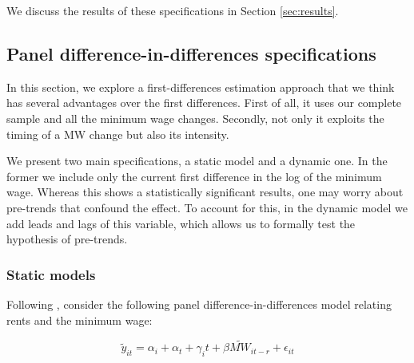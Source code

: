     We discuss the results of these specifications in Section \ref{sec:results}.
    

\subsection{Panel difference-in-differences specifications} \label{subsec:empirical_strategy/first-difference}

    In this section, we explore a first-differences estimation approach that we think has several advantages over the first differences. First of all, it uses our complete sample and all the minimum wage changes. Secondly, not only it exploits the timing of a MW change but also its intensity. 
    
    We present two main specifications, a static model and a dynamic one. In the former we include only the current first difference in the log of the minimum wage. Whereas this shows a statistically significant results, one may worry about pre-trends that confound the effect. To account for this, in the dynamic model we add leads and lags of this variable, which allows us to formally test the hypothesis of pre-trends.

\subsubsection{Static models}

    Following \textcite{meer2016effects}, consider the following panel difference-in-differences model relating rents and the minimum wage:

\begin{equation}\label{eq:diff_main}
        \tilde{y}_{it} = \alpha_i + \alpha_t + \gamma_i t + \beta \tilde{MW}_{it-r} + \epsilon_{it}
\end{equation}
    
